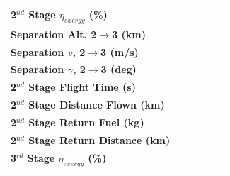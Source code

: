 \begin{table}[ht]
\begin{tabular}{l c c c c c }
		\\
		\hline 
		\textbf{2$^{nd}$ Stage $\eta_{exergy}$ (\%)}
		& \textbf{\secondExergyEffheatLimStandard}
		& \textbf{\secondExergyEffheatLimSeventeenHundred}
		& \textbf{\secondExergyEffheatLimSixteenHundred}
		& \textbf{\secondExergyEffheatLimFifteenHundred}
		& \textbf{\secondExergyEffheatLimFourteenHundred}
		\\
		\textbf{Separation Alt, 2$\rightarrow$3 (km)}
		& \secondthirdSeparationAltheatLimStandard
		& \secondthirdSeparationAltheatLimSeventeenHundred
		& \secondthirdSeparationAltheatLimSixteenHundred
		& \secondthirdSeparationAltheatLimFifteenHundred
		& \secondthirdSeparationAltheatLimFourteenHundred
		\\
		\textbf{Separation $v$, 2$\rightarrow$3 (m/s)}
		& \secondthirdSeparationvheatLimStandard
		& \secondthirdSeparationvheatLimSeventeenHundred
		& \secondthirdSeparationvheatLimSixteenHundred
		& \secondthirdSeparationvheatLimFifteenHundred
		& \secondthirdSeparationvheatLimFourteenHundred
		\\
		\textbf{Separation $\gamma$, 2$\rightarrow$3 (deg)}
		& \secondthirdSeparationgammaheatLimStandard
		& \secondthirdSeparationgammaheatLimSeventeenHundred
		& \secondthirdSeparationgammaheatLimSixteenHundred
		& \secondthirdSeparationgammaheatLimFifteenHundred
		& \secondthirdSeparationgammaheatLimFourteenHundred
		\\
		\textbf{2$^{nd}$ Stage Flight Time (s)}
		& \secondFlightTimeheatLimStandard
		& \secondFlightTimeheatLimSeventeenHundred
		& \secondFlightTimeheatLimSixteenHundred
		& \secondFlightTimeheatLimFifteenHundred
		& \secondFlightTimeheatLimFourteenHundred
		\\
		\textbf{2$^{nd}$ Stage Distance Flown (km)}
		& \SecondDistheatLimStandard
		& \SecondDistheatLimSeventeenHundred
		& \SecondDistheatLimSixteenHundred
		& \SecondDistheatLimFifteenHundred
		& \SecondDistheatLimFourteenHundred
		\\
		\textbf{2$^{nd}$ Stage Return Fuel (kg)}
		& \returnFuelheatLimStandard
		& \returnFuelheatLimSeventeenHundred
		& \returnFuelheatLimSixteenHundred
		& \returnFuelheatLimFifteenHundred
		& \returnFuelheatLimFourteenHundred
		\\
		\textbf{2$^{nd}$ Stage Return Distance (km)}
		& \returnDistheatLimStandard
		& \returnDistheatLimSeventeenHundred
		& \returnDistheatLimSixteenHundred
		& \returnDistheatLimFifteenHundred
		& \returnDistheatLimFourteenHundred
		\\
		\hline 
		\textbf{3$^{rd}$ Stage $\eta_{exergy}$ (\%)}

\end{tabular}
\end{table}
